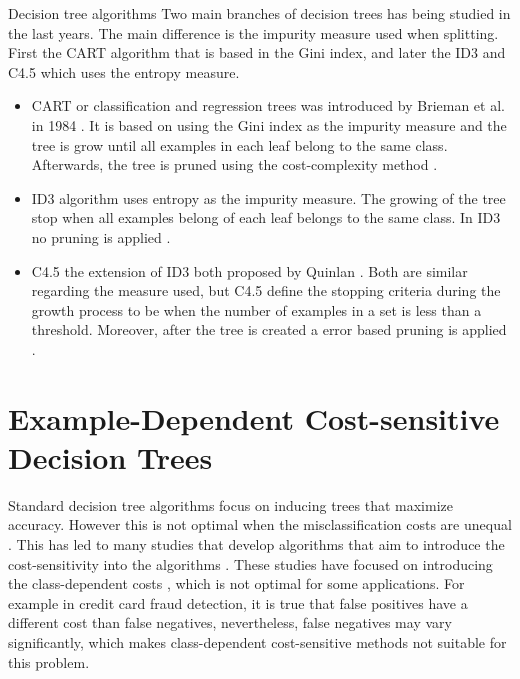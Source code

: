 \begin{remark}{Decision tree algorithms}
Two main branches of decision trees has being studied in the last years. The main difference is 
the  impurity measure used when splitting. First the CART algorithm that is based in the Gini 
index, and  later the ID3 and C4.5 which uses the entropy measure.

\begin{itemize}
 \item 
  CART or classification and regression trees was introduced by Brieman et al. in 1984 
\citep{Breiman1984a}. It is based on using the Gini index as the impurity measure and the tree is 
grow until all examples in  each leaf belong to the same class. Afterwards, the tree is pruned 
using 
the cost-complexity  method \citep{Rokach2010,Marslan2009}.
  
\item ID3
  algorithm uses entropy as the impurity measure. The growing of the tree stop when all 
examples belong  of each leaf belongs to the same class. In ID3 no pruning is applied 
\citep{Quinlan1992}.
  
\item C4.5
  the extension of ID3 both proposed by Quinlan \citep{Quinlan1992}.  Both are similar 
regarding the measure used, but C4.5 define the stopping criteria during the growth process
  to be when the number of examples in a set is less than a threshold. Moreover, after the tree is 
created  a error based pruning is applied \citep{Rokach2010}.
\end{itemize} 
\end{remark}


\section{Example-Dependent Cost-sensitive Decision Trees}
\label{sec:8:csdt}

Standard decision tree algorithms focus on inducing trees that maximize accuracy. However this is 
	not optimal when the misclassification costs are unequal \citep{Elkan2001}. This has led to many 
	studies that develop algorithms that aim to introduce the cost-sensitivity into the algorithms 
	\citep{Lomax2013}. These studies have focused on introducing the class-dependent costs  
	\citep{Draper1994,Ting2002,Ling2004,Li2005,Kretowski2006,Vadera2010}, which is not optimal for 
	some applications. For example in credit card fraud detection, it is true that false positives 
	have a different cost than false negatives, nevertheless, false negatives may vary significantly, 
	which makes class-dependent cost-sensitive methods not suitable for this problem.
      
